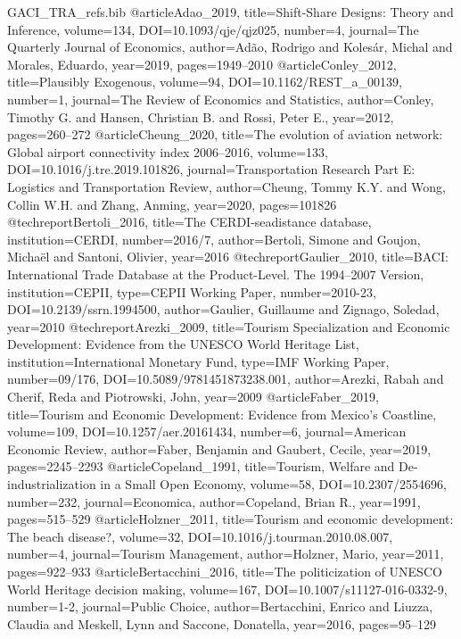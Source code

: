 \begin{filecontents*}[overwrite]{GACI_TRA_refs.bib}
@article{Adao_2019, title={Shift-Share Designs: Theory and Inference}, volume={134}, DOI={10.1093/qje/qjz025}, number={4}, journal={The Quarterly Journal of Economics}, author={Ad\~ao, Rodrigo and Koles\'ar, Michal and Morales, Eduardo}, year={2019}, pages={1949--2010} }
@article{Conley_2012, title={Plausibly Exogenous}, volume={94}, DOI={10.1162/REST_a_00139}, number={1}, journal={The Review of Economics and Statistics}, author={Conley, Timothy G. and Hansen, Christian B. and Rossi, Peter E.}, year={2012}, pages={260--272} }
@article{Cheung_2020, title={The evolution of aviation network: Global airport connectivity index 2006--2016}, volume={133}, DOI={10.1016/j.tre.2019.101826}, journal={Transportation Research Part E: Logistics and Transportation Review}, author={Cheung, Tommy K.Y. and Wong, Collin W.H. and Zhang, Anming}, year={2020}, pages={101826} }
@techreport{Bertoli_2016, title={The {CERDI}-seadistance database}, institution={CERDI}, number={2016/7}, author={Bertoli, Simone and Goujon, Micha\"el and Santoni, Olivier}, year={2016} }
@techreport{Gaulier_2010, title={{BACI}: International Trade Database at the Product-Level. The 1994--2007 Version}, institution={CEPII}, type={CEPII Working Paper}, number={2010-23}, DOI={10.2139/ssrn.1994500}, author={Gaulier, Guillaume and Zignago, Soledad}, year={2010} }
@techreport{Arezki_2009, title={Tourism Specialization and Economic Development: Evidence from the {UNESCO} World Heritage List}, institution={International Monetary Fund}, type={IMF Working Paper}, number={09/176}, DOI={10.5089/9781451873238.001}, author={Arezki, Rabah and Cherif, Reda and Piotrowski, John}, year={2009} }
@article{Faber_2019, title={Tourism and Economic Development: Evidence from Mexico's Coastline}, volume={109}, DOI={10.1257/aer.20161434}, number={6}, journal={American Economic Review}, author={Faber, Benjamin and Gaubert, Cecile}, year={2019}, pages={2245--2293} }
@article{Copeland_1991, title={Tourism, Welfare and De-industrialization in a Small Open Economy}, volume={58}, DOI={10.2307/2554696}, number={232}, journal={Economica}, author={Copeland, Brian R.}, year={1991}, pages={515--529} }
@article{Holzner_2011, title={Tourism and economic development: The beach disease?}, volume={32}, DOI={10.1016/j.tourman.2010.08.007}, number={4}, journal={Tourism Management}, author={Holzner, Mario}, year={2011}, pages={922--933} }
@article{Bertacchini_2016, title={The politicization of {UNESCO} World Heritage decision making}, volume={167}, DOI={10.1007/s11127-016-0332-9}, number={1-2}, journal={Public Choice}, author={Bertacchini, Enrico and Liuzza, Claudia and Meskell, Lynn and Saccone, Donatella}, year={2016}, pages={95--129} }

\end{filecontents*}
